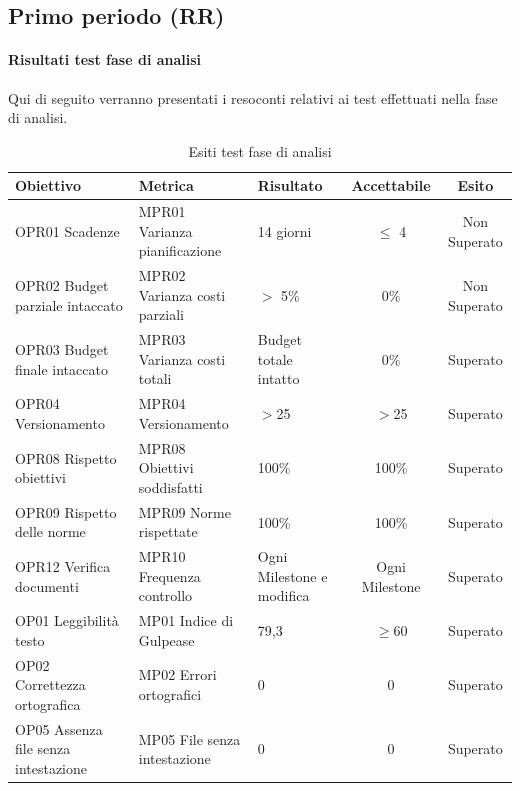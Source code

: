\documentclass[../piano_di_qualifica.tex]{subfiles}
\begin{document}
\subsection{Primo periodo (RR)}
\label{sub:periodo-RR}
\paragraph{Risultati test fase di analisi}
Qui di seguito verranno presentati i resoconti relativi ai test effettuati nella fase di analisi. \par

\begin{table}[!ht]
	\centering
	\begin{tabular}{|p{4cm}|p{4cm}|l|c|c|}
		\hline
		\rowcolor{lightgray}
		\textbf{Obiettivo}            			& \textbf{Metrica}              & \textbf{Risultato}                    & \textbf{Accettabile} & \textbf{Esito} \\
		\hline
		OPR01 Scadenze		        			& MPR01 Varianza pianificazione & 14 giorni                             & $\leq$ 4           & Non Superato   \\
		OPR02 Budget parziale intaccato        	& MPR02 Varianza costi parziali & $>$ 5\%								& 0\%                  & Non Superato   \\
		OPR03 Budget finale intaccato        	& MPR03 Varianza costi totali   & Budget totale intatto					& 0\%                  & Superato       \\
		OPR04 Versionamento						& MPR04 Versionamento			& $>$25									&$>$25					& Superato	\\
		OPR08 Rispetto obiettivi      			& MPR08 Obiettivi soddisfatti   & 100\%                                 & 100\%                & Superato       \\
		OPR09 Rispetto delle norme   			& MPR09 Norme rispettate        & 100\%                                 & 100\%                & Superato       \\
		OPR12 Verifica documenti      			& MPR10 Frequenza controllo     & Ogni Milestone e modifica         	& Ogni Milestone       & Superato       \\
		OP01 Leggibilità testo       			& MP01 Indice di Gulpease      & 79,3                                  & \(\ge 60\)           & Superato       \\
		OP02 Correttezza ortografica 			& MP02 Errori ortografici      & 0                                     & 0                    & Superato       \\
		OP05 Assenza file senza intestazione	& MP05 File senza intestazione 	& 0										& 0						& Superato		\\
		\hline
	\end{tabular}
	\caption{Esiti test fase di analisi}
\end{table}
\end{document}

